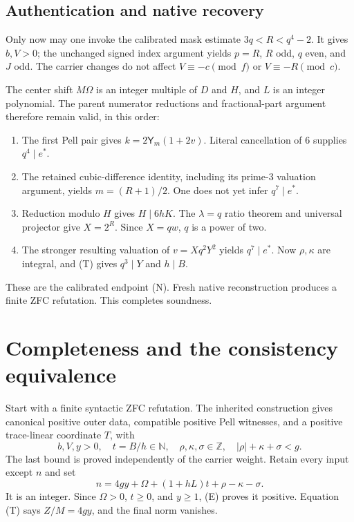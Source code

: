 \documentclass[11pt]{article}
\theoremstyle{remark}
\newcommand{\Z}{\mathbb Z}
\newcommand{\N}{\mathbb N}
\newcommand{\PellY}{\mathsf Y}
\begin{document}
\subsection{Authentication and native recovery}
Only now may one invoke the calibrated mask estimate \(3q<R<q^4-2\).
It gives \(b,V>0\); the unchanged signed index argument yields
\(p=R\), \(R\) odd, \(q\) even, and \(J\) odd.
The carrier changes do not affect
\(V\equiv-c\pmod f\) or \(V\equiv-R\pmod c\).

The center shift \(M\Omega\) is an integer multiple of \(D\) and \(H\),
and \(L\) is an integer polynomial. The parent numerator reductions
and fractional-part argument therefore remain valid, in this order:
\begin{enumerate}
\item The first Pell pair gives \(k=2\PellY_m(1+2v)\).
Literal cancellation of \(6\) supplies \(q^4\mid e^*\).
\item The retained cubic-difference identity, including its prime-\(3\)
valuation argument, yields \(m=(R+1)/2\).
One does not yet infer \(q^7\mid e^*\).
\item Reduction modulo \(H\) gives \(H\mid6hK\).
The \(\lambda=q\) ratio theorem and universal projector give \(X=2^R\).
Since \(X=qw\), \(q\) is a power of two.
\item The stronger resulting valuation of \(v=Xq^2Y^2\) yields
\(q^7\mid e^*\). Now \(\rho,\kappa\) are integral, and (T) gives
\(q^3\mid Y\) and \(h\mid B\).
\end{enumerate}
These are the calibrated endpoint (N). Fresh native reconstruction
produces a finite ZFC refutation. This completes soundness.

\section{Completeness and the consistency equivalence}
Start with a finite syntactic ZFC refutation. The inherited construction
gives canonical positive outer data, compatible positive Pell witnesses,
and a positive trace-linear coordinate \(T\), with
\[
 b,V,y>0,\quad t=B/h\in\N,\quad
 \rho,\kappa,\sigma\in\Z,\quad |\rho|+\kappa+\sigma<g. \tag{E}
\]
The last bound is proved independently of the carrier weight.
Retain every input except \(n\) and set
\[
 n=4gy+\Omega+(1+hL)t+\rho-\kappa-\sigma.          \tag{E1}
\]
It is an integer. Since \(\Omega>0\), \(t\ge0\), and \(y\ge1\),
(E) proves it positive. Equation (T) says \(Z/M=4gy\), and the final
norm vanishes.
\end{document}
